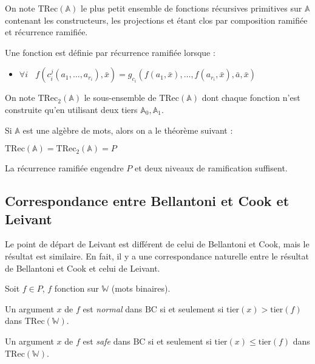 \documentclass{article}
\newcommand{\bbA}{\mathbb{A}}
\newcommand{\TRec}[1]{\text{TRec}\left(\mathbb{#1}\right)}
\newcommand{\TRecd}[1]{\text{TRec}_{2}\left(\mathbb{#1}\right)}
\begin{document}
		\begin{definition}
			On note $\TRec{A}$ le plus petit ensemble de fonctions récursives primitives sur $\bbA$ contenant les constructeurs, les projections et étant clos par composition ramifiée et récurrence ramifiée.
			
			
			Une fonction est définie par récurrence ramifiée lorsque :
			
			\begin{itemize}
				\item 	$\forall i \:\:\:\:
				f(c_i^j(a_1, \dots, a_{r_i}), \bar{x}) 
				= g_{c_i}\left( f(a_1, \bar{x}), \dots, f(a_{r_i}, \bar{x}), \bar{a}, \bar{x} \right)
				$
			\end{itemize}
			
			
			On note $\TRecd{A}$ le sous-ensemble de $\TRec{A}$ dont chaque fonction n'est construite qu'en utilisant deux tiers $\bbA_0, \bbA_1$.
		\end{definition}
		
		Si $\bbA$ est une algèbre de mots, alors on a le théorème suivant :
		
		\begin{theorem}
			$\TRec{A} = \TRecd{A} = P$
		\end{theorem}
		
		La récurrence ramifiée engendre $P$ et deux niveaux de ramification suffisent.
	
	
		\subsection{Correspondance entre Bellantoni et Cook et Leivant}
	
	
		Le point de départ de Leivant est différent de celui de Bellantoni et Cook, mais le résultat est similaire. En fait, il y a une correspondance naturelle entre le résultat de Bellantoni et Cook et celui de Leivant.
		
		\begin{lemma}
			Soit $f \in P$, $f$ fonction sur $\mathbb{W}$ (mots binaires).
			
			Un argument $x$ de $f$ est \emph{normal} dans $\text{BC}$ si et seulement si $\text{tier}(x) > \text{tier}(f)$ dans $\TRec{W}$.
			
			Un argument $x$ de $f$ est \emph{safe} dans $\text{BC}$ si et seulement si $\text{tier}(x) \leq \text{tier}(f)$ dans $\TRec{W}$.
		\end{lemma}
	
\end{document}
